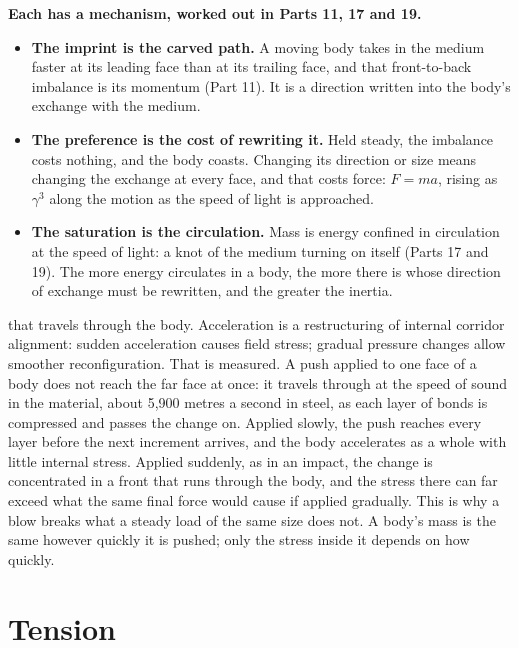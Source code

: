 \documentclass[11pt,a4paper]{article}
\begin{document}
\begin{hypbar}
\textbf{Each has a mechanism, worked out in Parts 11, 17 and 19.}
\begin{itemize}
\item \textbf{The imprint is the carved path.} A moving body takes in the medium faster at its leading face than at its trailing face, and that front-to-back imbalance is its momentum (Part 11).\footnotemark{} It is a direction written into the body's exchange with the medium.
\item \textbf{The preference is the cost of rewriting it.} Held steady, the imbalance costs nothing, and the body coasts. Changing its direction or size means changing the exchange at every face, and that costs force: $F=ma$, rising as $\gamma^3$ along the motion as the speed of light is approached.
\item \textbf{The saturation is the circulation.} Mass is energy confined in circulation at the speed of light: a knot of the medium turning on itself (Parts 17 and 19). The more energy circulates in a body, the more there is whose direction of exchange must be rewritten, and the greater the inertia.
\end{itemize}
\end{hypbar}

 that travels through the body. Acceleration is a restructuring of internal corridor alignment: sudden acceleration causes field stress; gradual pressure changes allow smoother reconfiguration. That is measured. A push applied to one face of a body does not reach the far face at once: it travels through at the speed of sound in the material, about 5,900 metres a second in steel, as each layer of bonds is compressed and passes the change on. Applied slowly, the push reaches every layer before the next increment arrives, and the body accelerates as a whole with little internal stress. Applied suddenly, as in an impact, the change is concentrated in a front that runs through the body, and the stress there can far exceed what the same final force would cause if applied gradually. This is why a blow breaks what a steady load of the same size does not. A body's mass is the same however quickly it is pushed; only the stress inside it depends on how quickly.

\section{Tension}
\end{document}
